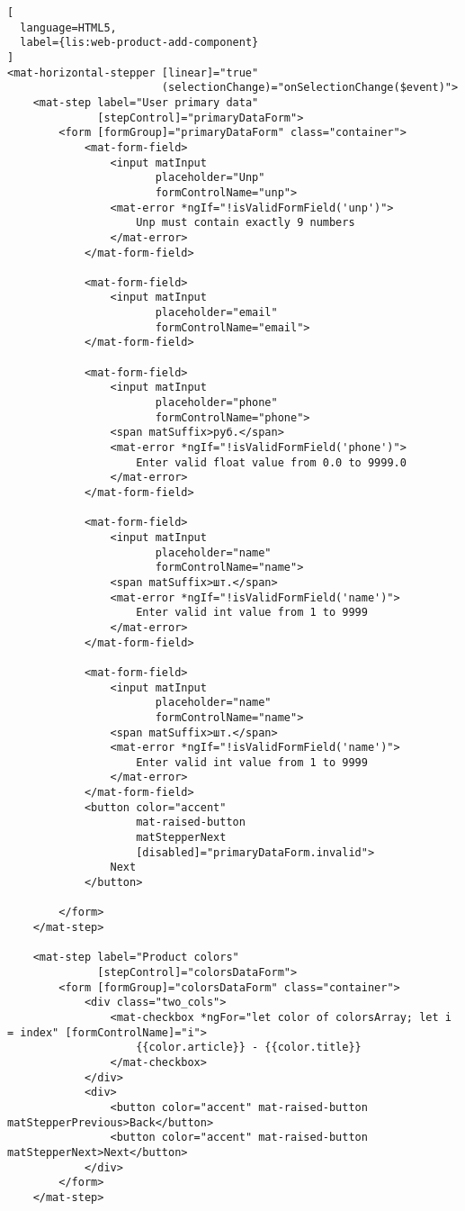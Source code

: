 \begin{lstlisting}[
  language=HTML5,
  label={lis:web-product-add-component}
]
<mat-horizontal-stepper [linear]="true"
                        (selectionChange)="onSelectionChange($event)">
    <mat-step label="User primary data"
              [stepControl]="primaryDataForm">
        <form [formGroup]="primaryDataForm" class="container">
            <mat-form-field>
                <input matInput
                       placeholder="Unp"
                       formControlName="unp">
                <mat-error *ngIf="!isValidFormField('unp')">
                    Unp must contain exactly 9 numbers
                </mat-error>
            </mat-form-field>

            <mat-form-field>
                <input matInput
                       placeholder="email"
                       formControlName="email">
            </mat-form-field>

            <mat-form-field>
                <input matInput
                       placeholder="phone"
                       formControlName="phone">
                <span matSuffix>руб.</span>
                <mat-error *ngIf="!isValidFormField('phone')">
                    Enter valid float value from 0.0 to 9999.0
                </mat-error>
            </mat-form-field>

            <mat-form-field>
                <input matInput
                       placeholder="name"
                       formControlName="name">
                <span matSuffix>шт.</span>
                <mat-error *ngIf="!isValidFormField('name')">
                    Enter valid int value from 1 to 9999
                </mat-error>
            </mat-form-field>

            <mat-form-field>
                <input matInput
                       placeholder="name"
                       formControlName="name">
                <span matSuffix>шт.</span>
                <mat-error *ngIf="!isValidFormField('name')">
                    Enter valid int value from 1 to 9999
                </mat-error>
            </mat-form-field>
            <button color="accent"
                    mat-raised-button
                    matStepperNext
                    [disabled]="primaryDataForm.invalid">
                Next
            </button>

        </form>
    </mat-step>

    <mat-step label="Product colors"
              [stepControl]="colorsDataForm">
        <form [formGroup]="colorsDataForm" class="container">
            <div class="two_cols">
                <mat-checkbox *ngFor="let color of colorsArray; let i = index" [formControlName]="i">
                    {{color.article}} - {{color.title}}
                </mat-checkbox>
            </div>
            <div>
                <button color="accent" mat-raised-button matStepperPrevious>Back</button>
                <button color="accent" mat-raised-button matStepperNext>Next</button>
            </div>
        </form>
    </mat-step>


\end{lstlisting}

